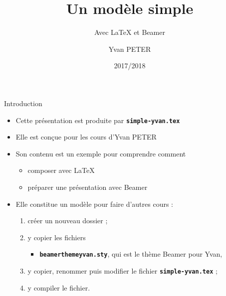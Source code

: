 \documentclass[10pt,t]{beamer}
\title{Un modèle simple}
\subtitle{Avec \LaTeX{} et Beamer}
\author{Yvan PETER}
\institute[]{Université Lille~1 \and IUT «A»}
\date{2017/2018}
\begin{document}
\maketitle


\begin{frame}{Introduction} 

  \begin{itemize}
  \item Cette présentation est produite par \texttt{\textbf{simple-yvan.tex}}
  \item Elle est conçue pour les cours d'Yvan PETER
  \item Son contenu est un exemple pour comprendre comment

    \begin{itemize}
    \item composer avec \LaTeX{}
    \item préparer une présentation avec Beamer
    \end{itemize}

  \end{itemize}

  \pause


  \begin{itemize}
  \item Elle constitue un modèle pour faire d'autres cours :
      
    \begin{enumerate}
    \item créer un nouveau dossier ;
    \item y copier les fichiers 
      
      \begin{itemize}
      \item \texttt{\textbf{beamerthemeyvan.sty}}, qui est le thème Beamer pour Yvan,
      \end{itemize}
      
    \item y copier, renommer puis modifier le fichier \texttt{\textbf{simple-yvan.tex}} ;
    \item y compiler le fichier.
    \end{enumerate}
  \end{itemize}
\end{frame}
\end{document}
